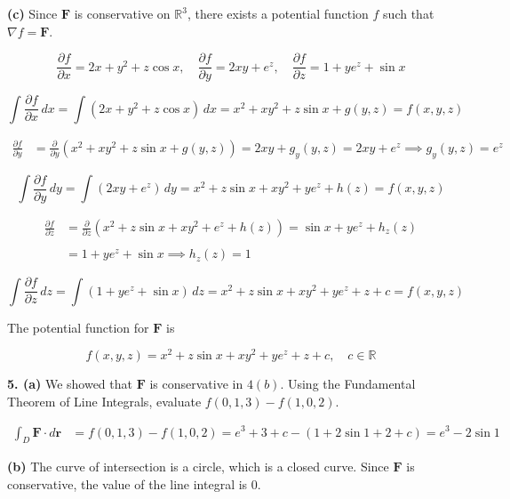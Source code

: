 \documentclass{article}
\begin{document}
\textbf{(c)} Since $\mathbf{F}$ is conservative on $\mathbb{R}^3$, there exists a potential function $f$ such that $\nabla f=\mathbf{F}$.

\[\frac{\partial f}{\partial x}=2x+y^2+z\cos x,\quad\frac{\partial f}{\partial y}=2xy+{e}^z,\quad\frac{\partial f}{\partial z}=1+y{e}^z+\sin x\]

\[\int\frac{\partial f}{\partial x}\,dx=\int\left(2x+y^2+z\cos x\right)\,dx=x^2+xy^2+z\sin x+g(y,z)=f(x,y,z)\]

\begin{align*}\frac{\partial f}{\partial y}&=\frac{\partial}{\partial y}\left(x^2+xy^2+z\sin x+g(y,z)\right)=2xy+g_y(y,z)=2xy+{e}^z\implies g_y(y,z)={e}^z\end{align*}

\[\int\frac{\partial f}{\partial y}\,dy=\int\left(2xy+{e}^z\right)\,dy=x^2+z\sin x+xy^2+y{e}^z+h(z)=f(x,y,z)\]

\begin{align*}\frac{\partial f}{\partial z}&=\frac{\partial}{\partial z}\left(x^2+z\sin x+xy^2+{e}^z+h(z)\right)=\sin x+y{e}^z+h_z(z)\\\\&=1+y{e}^z+\sin x\implies h_z(z)=1\end{align*}

\[\int\frac{\partial f}{\partial z}\,dz=\int\left(1+y{e}^z+\sin x\right)\,dz=x^2+z\sin x+xy^2+y{e}^z+z+c=f(x,y,z)\]

The potential function for $\mathbf{F}$ is

\[\boxed{f(x,y,z)=x^2+z\sin x+xy^2+y{e}^z+z+c,\quad c\in\mathbb{R}}\]

\vspace{1em}

\textbf{5. (a)} We showed that $\mathbf{F}$ is conservative in $4(b)$. Using the Fundamental Theorem of Line Integrals, evaluate $f(0,1,3)-f(1,0,2)$.

\begin{align*}\int_D\mathbf{F}\cdot d\mathbf{r}&=f(0,1,3)-f(1,0,2)={e}^3+3+c-(1+2\sin1+2+c)=\boxed{{e}^3-2\sin1}\end{align*}

\textbf{(b)} The curve of intersection is a circle, which is a closed curve. Since $\mathbf{F}$ is conservative, the value of the line integral is $\boxed0$.

\vspace{1em}
\end{document}
